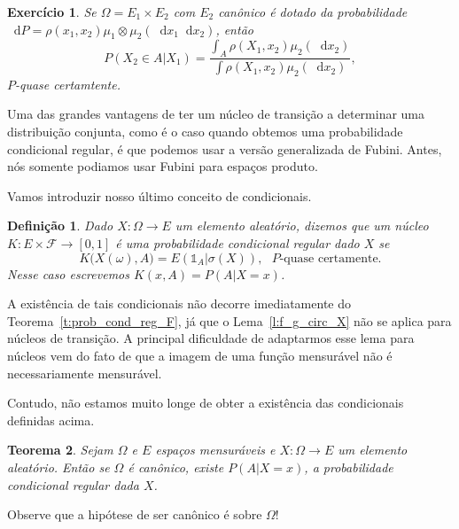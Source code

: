\documentclass[reqno]{article}
\newcommand*\1{\mathds{1}}
\newtheorem{theorem}{Teorema}[section]
\newtheorem{definition}[theorem]{Definição}
\newtheorem{exercise}[example]{Exercício}
\renewcommand*\d{\mathop{}\!\mathrm{d}}
\begin{document}
\begin{exercise}
  Se $\Omega = E_1 \times E_2$ com $E_2$ canônico é dotado da probabilidade $\d P = \rho(x_1, x_2) \mu_1 \otimes \mu_2 (\d x_1 \d x_2)$, então
  \begin{equation}
    P(X_2 \in A|X_1) = \frac{\int_A \rho(X_1, x_2) \mu_2(\d x_2)}{\int \rho(X_1, x_2) \mu_2(\d x_2)},
  \end{equation}
  $P$-quase certamtente.
\end{exercise}

\newpage

Uma das grandes vantagens de ter um núcleo de transição a determinar uma distribuição conjunta, como é o caso quando obtemos uma probabilidade condicional regular, é que podemos usar a versão generalizada de Fubini.
Antes, nós somente podiamos usar Fubini para espaços produto.

Vamos introduzir nosso último conceito de condicionais.

\begin{definition}
  Dado $X:\Omega \to E$ um elemento aleatório, dizemos que um núcleo $K: E \times \mathcal{F} \to [0,1]$ é uma \emph{probabilidade condicional regular dado $X$} se
  \begin{equation}
    \label{e:K_prob_cond_reg_X}
    K\big( X(\omega), A\big) = E(\1_A|\sigma(X)), \text{ $P$-quase certamente.}
  \end{equation}
  Nesse caso escrevemos $K(x, A) = P(A|X = x)$.
\end{definition}

A existência de tais condicionais não decorre imediatamente do Teorema~\ref{t:prob_cond_reg_F}, já que o Lema~\ref{l:f_g_circ_X} não se aplica para núcleos de transição.
A principal dificuldade de adaptarmos esse lema para núcleos vem do fato de que a imagem de uma função mensurável não é necessariamente mensurável.

Contudo, não estamos muito longe de obter a existência das condicionais definidas acima.

\begin{theorem}
  \label{t:prob_cond_reg_X}
  Sejam $\Omega$ e $E$ espaços mensuráveis e $X: \Omega \to E$ um elemento aleatório.
  Então se $\Omega$ é canônico, existe $P(A|X = x)$, a probabilidade condicional regular dada $X$.
\end{theorem}

Observe que a hipótese de ser canônico é sobre $\Omega$!
\end{document}
